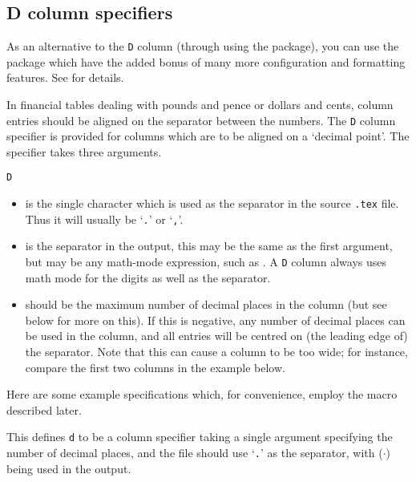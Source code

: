 \goodbreak
 
 \subsection{D column specifiers} \label{sec:dcolumns}

 \begin{recommended}
   As an alternative to the \texttt{D} column (through using the
    package), you can use the  package
   which have the added bonus of many more configuration and
   formatting features. See \cite{SIUNITX} for details.
 \end{recommended}


 
    In financial tables dealing with pounds
and pence or dollars and cents, column entries
should be aligned on the separator between the numbers. The \texttt{D}
column specifier is provided for columns which are to be aligned on 
a `decimal point'. The specifier takes three arguments.
\begin{syntax}
 \texttt{D} \\
\end{syntax}
\begin{itemize}
\item[\meta{ssep}] is the single character which is used as the
 separator in the source \texttt{.tex} file. Thus it will usually 
be `\texttt{.}' or  `\texttt{,}'.

\item[\meta{osep}] is the separator in the output, this may
 be the same as the first argument, but may be any math-mode
 expression, such as \cmd{\cdot}. A \texttt{D} column
 always uses math mode for the digits as well as the separator.

\item[\meta{places}] should be the maximum number of decimal places
 in the column (but see below for more on this). 
If this is negative, any number of decimal places can
 be used in the column, and all entries will be centred on 
 (the leading edge of) the 
 separator. Note that this can cause a column to be too wide; for instance, 
compare  the first two columns in the example below. 
\end{itemize}

    Here are some example specifications which, for convenience, employ
the \cmd{\newcolumntype} macro described later.

    This defines \texttt{d} to be a column specifier taking a single argument 
specifying the number of decimal places, 
and the  file should use `\texttt{.}' as the separator, with
\cmd{\cdot} ($\cdot$) being used in the output.

